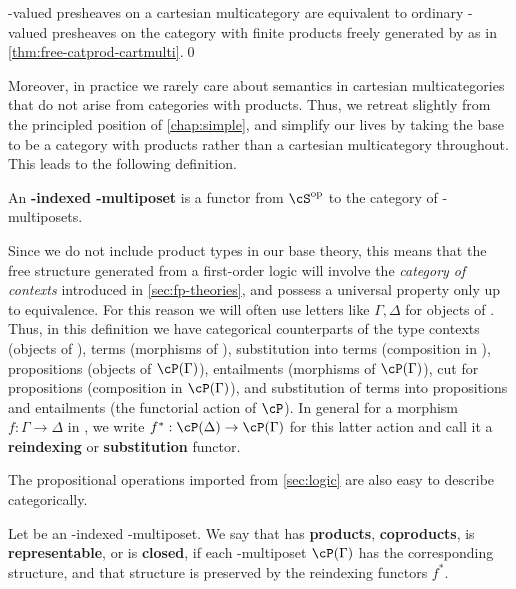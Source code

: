 \begin{lem}\label{thm:pshf-multi-catprod}
  \bC-valued presheaves on a cartesian multicategory \cS are equivalent to ordinary \bC-valued presheaves on the category with finite products freely generated by \cS as in \cref{thm:free-catprod-cartmulti}.\qed
\end{lem}

Moreover, in practice we rarely care about semantics in cartesian multicategories that do not arise from categories with products.
Thus, we retreat slightly from the principled position of \cref{chap:simple}, and simplify our lives by taking the base \cS to be a category with products rather than a cartesian multicategory throughout.
This leads to the following definition.

\begin{defn}
  An \textbf{\cS-indexed \fS-multiposet} is a functor \cP from $\cS\op$ to the category of \fS-multiposets.
\end{defn}

Since we do not include product types in our base theory, this means that the free structure generated from a first-order logic will involve the \emph{category of contexts} introduced in \cref{sec:fp-theories}, and possess a universal property only up to equivalence.
For this reason we will often use letters like $\Gamma,\Delta$ for objects of \cS.
Thus, in this definition we have categorical counterparts of the type contexts (objects of \cS), terms (morphisms of \cS), substitution into terms (composition in \cS), propositions (objects of $\cP(\Gamma)$), entailments (morphisms of $\cP(\Gamma)$), cut for propositions (composition in $\cP(\Gamma)$), and substitution of terms into propositions and entailments (the functorial action of $\cP$).
In general for a morphism $f:\Gamma\to\Delta$ in \cS, we write $f^* : \cP(\Delta) \to \cP(\Gamma)$ for this latter action and call it a \textbf{reindexing} or \textbf{substitution} functor.

The propositional operations imported from \cref{sec:logic} are also easy to describe categorically.

\begin{defn}\label{defn:hyperdoctrine-heyting-fibers}
  Let \cP be an \cS-indexed \fS-multiposet.
  We say that \cP has \textbf{products}, \textbf{coproducts}, is \textbf{representable}, or is \textbf{closed}, if each \fS-multiposet $\cP(\Gamma)$ has the corresponding structure, and that structure is preserved by the reindexing functors $f^*$.
\end{defn}

